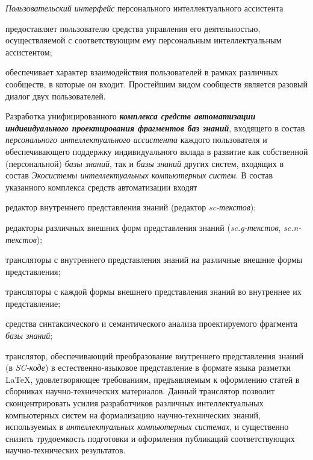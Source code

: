 \begin{textitemize}
\begin{textitemize}
	\end{textitemize}
	\textit{Пользовательский интерфейс} персонального интеллектуального ассистента
	\begin{textitemize}
		\item предоставляет пользователю средства управления его  деятельностью, осуществляемой  с соответствующим ему персональным интеллектуальным ассистентом;
		\item обеспечивает  характер взаимодействия пользователей в рамках различных сообществ, в которые он входит. Простейшим видом сообществ является разовый диалог двух пользователей.
	\end{textitemize}
	\item
	Разработка унифицированного \textbf{\textit{комплекса средств автоматизации индивидуального проектирования фрагментов баз знаний}}, входящего в состав \textit{персонального интеллектуального ассистента} каждого пользователя и обеспечивающего поддержку индивидуального вклада в развитие как собственной (персональной) \textit{базы знаний}, так и \textit{базы знаний} других систем, входящих в состав \textit{Экосистемы интеллектуальных компьютерных систем}. В состав указанного комплекса средств автоматизации входят
	\begin{textitemize}
		\item редактор внутреннего представления знаний (редактор \textit{sc-текстов});
		\item редакторы различных внешних форм представления знаний (\textit{sc.g-текстов}, \textit{sc.n-текстов});
		\item трансляторы с внутреннего представления знаний на различные внешние формы представления;
		\item трансляторы с каждой формы внешнего представления знаний во внутреннее их представление;
		\item средства синтаксического и семантического анализа проектируемого фрагмента \textit{базы знаний};
		\item транслятор, обеспечивающий преобразование внутреннего представления знаний (в \textit{SC-коде}) в естествен\-но-языковое представление в формате языка разметки LaTeX, удовлетворяющее требованиям, предъявляемым к оформлению статей в сборниках научно-технических материалов. Данный транслятор позволит сконцентрировать усилия разработчиков различных интеллектуальных компьютерных систем на формализацию научно-технических знаний, используемых в \textit{интеллектуальных компьютерных системах}, и существенно снизить трудоемкость подготовки и оформления публикаций соответствующих научно-технических результатов.\\

\end{textitemize}
\end{textitemize}
